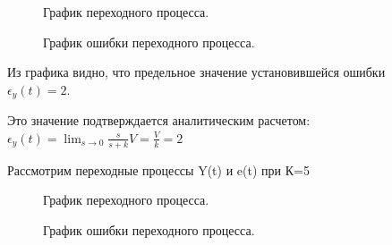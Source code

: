\documentclass[a4paper, 11pt]{article}
\begin{document}
\begin{figure}[h]
    \caption{График переходного процесса.}
    \label{two}
\end{figure}
\begin{figure}[h]
    \caption{График ошибки переходного процесса.}
    \label{tree}
\end{figure}

\newpage

\normalsize{Из графика видно, что предельное значение установившейся ошибки \\ $\epsilon_y(t)=2$.

Это значение подтверждается аналитическим расчетом: \\ $\epsilon_y(t)=\lim_{s\to0}\frac{s}{s+k}V=\frac{V}{k}=2$

Рассмотрим переходные процессы Y(t) и e(t) при К=5}

\begin{figure}[h]
    \caption{График переходного процесса.}
    \label{two}
\end{figure}
\begin{figure}[h]
    \caption{График ошибки переходного процесса.}
    \label{tree}
\end{figure}
\end{document}
